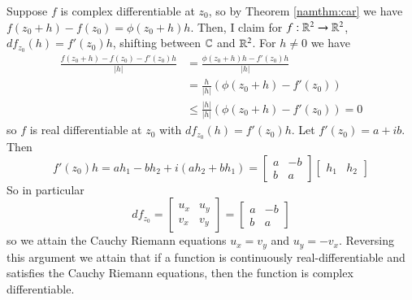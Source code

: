\documentclass[12pt, a4paper, oneside, openright, titlepage]{book}
\begin{document}
Suppose $f$ is complex differentiable at $z_0$, so by Theorem \ref{namthm:car} we have $f(z_0+h) - f(z_0) = \phi(z_0+h)h$. Then, I claim for $f:\mathbb R^2\rightarrow \mathbb R^2$, $df_{z_0}(h) = f'(z_0)h$, shifting between $\mathbb C$ and $\mathbb R^2$. For $h \neq 0$ we have \begin{align*}
    \frac{f(z_0+h)-f(z_0) -f'(z_0)h}{|h|} &= \frac{\phi(z_0+h)h-f'(z_0)h}{|h|} \\
    &= \frac{h}{|h|}(\phi(z_0+h)-f'(z_0)) \\
    &\leq \frac{|h|}{|h|}(\phi(z_0+h)-f'(z_0)) = 0
\end{align*}
so $f$ is real differentiable at $z_0$ with $df_{z_0}(h) = f'(z_0)h$. Let $f'(z_0) = a+ib$. Then $$f'(z_0)h = ah_1-bh_2 + i(ah_2+bh_1) = \begin{bmatrix} a & -b \\ b & a \end{bmatrix}\begin{bmatrix} h_1 & h_2 \end{bmatrix}$$ So in particular $$df_{z_0} = \begin{bmatrix} u_x & u_y \\ v_x & v_y \end{bmatrix} = \begin{bmatrix} a & -b \\ b & a \end{bmatrix}$$ so we attain the Cauchy Riemann equations $u_x = v_y$ and $u_y = -v_x$. Reversing this argument we attain that if a function is continuously real-differentiable and satisfies the Cauchy Riemann equations, then the function is complex differentiable.
\end{document}
